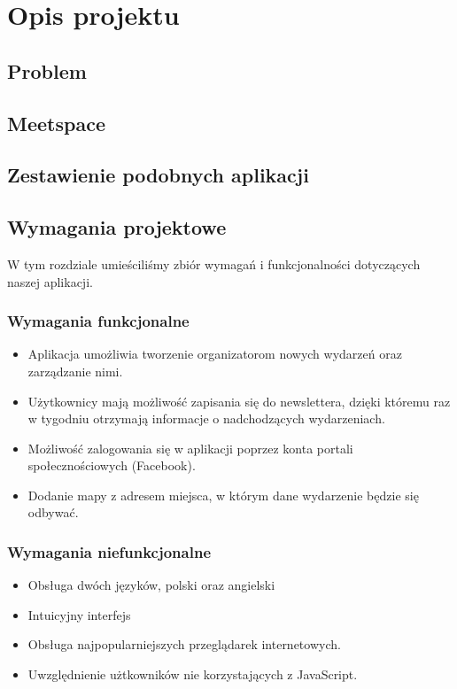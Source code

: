 \section{Opis projektu}

\subsection{Problem}
\subsection{Meetspace}
\subsection{Zestawienie podobnych aplikacji}
\subsection{Wymagania projektowe}
W tym rozdziale umieściliśmy zbiór wymagań i funkcjonalności dotyczących naszej aplikacji.
  \subsubsection{Wymagania funkcjonalne}
    \begin{itemize}
      \item Aplikacja umożliwia tworzenie organizatorom nowych wydarzeń oraz zarządzanie nimi.
      \item Użytkownicy mają możliwość zapisania się do newslettera, dzięki któremu raz w tygodniu otrzymają informacje o nadchodzących wydarzeniach.
      \item Możliwość zalogowania się w aplikacji poprzez konta portali społecznościowych (Facebook).
      \item Dodanie mapy z adresem miejsca, w którym dane wydarzenie będzie się odbywać.
    \end{itemize}
  \subsubsection{Wymagania niefunkcjonalne}
    \begin{itemize}
      \item Obsługa dwóch języków, polski oraz angielski
      \item Intuicyjny interfejs
      \item Obsługa najpopularniejszych przeglądarek internetowych.
      \item Uwzględnienie użtkowników nie korzystających z JavaScript.
    \end{itemize}


